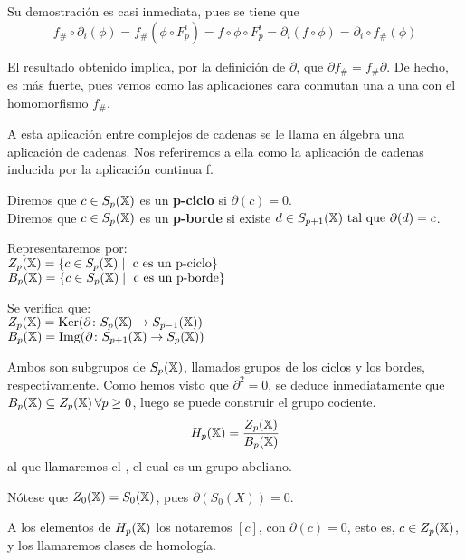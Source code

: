 Su demostración es casi inmediata, pues se tiene que \[ f_\# \circ \partial_i(\phi) = f_\#(\phi \circ F_p^i) = f \circ \phi \circ F_p^i
                                             = \partial_i(f \circ \phi) = \partial_i \circ f_\#(\phi) \]

El resultado obtenido implica, por la definición de $\partial$, que $\partial f_\# = f_\# \partial$. De hecho, es más fuerte, pues vemos
como las aplicaciones cara conmutan una a una con el homomorfismo $f_\#$.

A esta aplicación entre complejos de cadenas se le llama en álgebra una aplicación de cadenas. Nos referiremos a ella como la aplicación de cadenas
inducida por la aplicación continua f.

\begin{definition}
  Diremos que $c \in S_p({\mathbb X})$ es un \textbf{p-ciclo} si $\partial(c) = 0$. \\
  Diremos que $c \in S_p({\mathbb X})$ es un \textbf{p-borde} si existe $d \in S_{p+1}({\mathbb X}) \text{ tal que } \partial(d) = c$.
\end{definition}


Representaremos por: \\
$Z_p({\mathbb X}) = \{c \in S_p({\mathbb X}) \mid \text{ c es un p-ciclo}\}$ \\
$B_p({\mathbb X}) = \{c \in S_p({\mathbb X}) \mid \text{ c es un p-borde}\} $

Se verifica que: \\
$Z_p({\mathbb X}) = \operatorname{Ker} (\partial \colon S_p({\mathbb X}) \to S_{p-1}({\mathbb X})) $ \\
$B_p({\mathbb X}) = \operatorname{Img} (\partial \colon S_{p+1}({\mathbb X}) \to S_p({\mathbb X})) $

Ambos son subgrupos de $S_p({\mathbb X})$, llamados grupos de los ciclos y los bordes, respectivamente. Como hemos visto que $\partial^2 = 0$, se deduce
inmediatamente que $B_p({\mathbb X}) \subseteq Z_p({\mathbb X}) \hspace{0.2em}\forall p \geq 0$, luego se puede construir el grupo cociente.
\begin{equation*}
  H_p({\mathbb X}) = \frac{\displaystyle Z_p({\mathbb X})}{\displaystyle B_p({\mathbb X})}
\end{equation*}
al que llamaremos el \textbf{\underline{}}, el cual es un grupo abeliano.

\begin{remark}
  Nótese que $Z_0({\mathbb X}) = S_0({\mathbb X})$, pues $\partial(S_0(X)) = 0$.
\end{remark}

A los elementos de $H_p({\mathbb X})$ los notaremos $[c]$, con $\partial(c) = 0$, esto es, $c \in Z_p({\mathbb X})$, y los llamaremos clases de homología.

